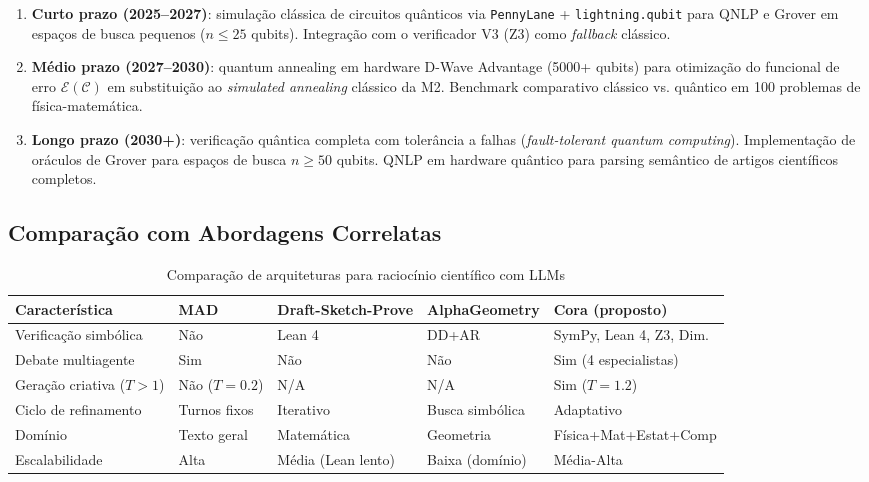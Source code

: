 \documentclass[5p]{elsarticle}
\theoremstyle{remark}
\begin{document}
\begin{enumerate}[label=(\roman*)]
    \item \textbf{Curto prazo (2025--2027)}: simulação clássica de circuitos quânticos via \texttt{PennyLane} + \texttt{lightning.qubit} para QNLP e Grover em espaços de busca pequenos ($n \leq 25$ qubits). Integração com o verificador V3 (Z3) como \textit{fallback} clássico.
    \item \textbf{Médio prazo (2027--2030)}: quantum annealing em hardware D-Wave Advantage (5000+ qubits) para otimização do funcional de erro $\mathcal{E}(\mathcal{C})$ em substituição ao \textit{simulated annealing} clássico da M2. Benchmark comparativo clássico vs. quântico em 100 problemas de física-matemática.
    \item \textbf{Longo prazo (2030+)}: verificação quântica completa com tolerância a falhas (\textit{fault-tolerant quantum computing}). Implementação de oráculos de Grover para espaços de busca $n \geq 50$ qubits. QNLP em hardware quântico para parsing semântico de artigos científicos completos.
\end{enumerate}

\subsection{Comparação com Abordagens Correlatas}

\begin{table}[htbp]
\centering
\caption{Comparação de arquiteturas para raciocínio científico com LLMs}
\label{tab:comparison}
\begin{tabular}{L{2.5cm} L{2.5cm} L{2.5cm} L{2.5cm} L{2.5cm}}
\toprule
\textbf{Característica} & \textbf{MAD} & \textbf{Draft-Sketch-Prove} & \textbf{AlphaGeometry} & \textbf{Cora (proposto)} \\
\midrule
Verificação simbólica & Não & Lean 4 & DD+AR & SymPy, Lean 4, Z3, Dim. \\
Debate multiagente & Sim & Não & Não & Sim (4 especialistas) \\
Geração criativa ($T>1$) & Não ($T=0.2$) & N/A & N/A & Sim ($T=1.2$) \\
Ciclo de refinamento & Turnos fixos & Iterativo & Busca simbólica & Adaptativo \\
Domínio & Texto geral & Matemática & Geometria & Física+Mat+Estat+Comp \\
Escalabilidade & Alta & Média (Lean lento) & Baixa (domínio) & Média-Alta \\
\bottomrule
\end{tabular}
\end{table}
\end{document}
